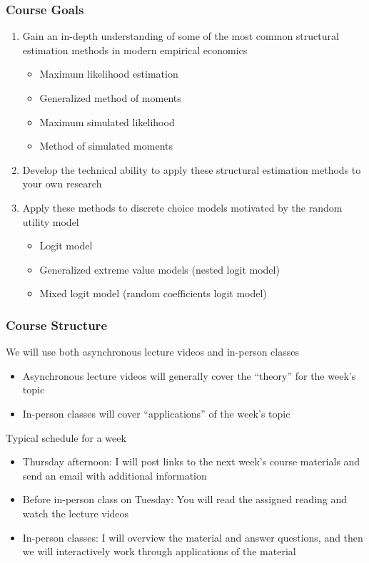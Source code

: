 \documentclass{beamer}
\begin{document}
\begin{frame}\frametitle{Course Goals}
    \begin{enumerate}
        \item Gain an in-depth understanding of some of the most common structural estimation methods in modern empirical economics
        \begin{itemize}
            \item Maximum likelihood estimation
            \item Generalized method of moments
            \item Maximum simulated likelihood
            \item Method of simulated moments
        \end{itemize}
        \vspace{2ex} 
        \item Develop the technical ability to apply these structural estimation methods to your own research
        \vspace{2ex}
        \item Apply these methods to discrete choice models motivated by the random utility model
        \begin{itemize}
            \item Logit model
            \item Generalized extreme value models (nested logit model)
            \item Mixed logit model (random coefficients logit model)
        \end{itemize}
    \end{enumerate}
\end{frame}

\begin{frame}\frametitle{Course Structure}
    We will use both asynchronous lecture videos and in-person classes
    \begin{itemize}
        \item Asynchronous lecture videos will generally cover the ``theory'' for the week's topic
        \item In-person classes will cover ``applications'' of the week's topic
    \end{itemize}
    \vspace{2ex}
    Typical schedule for a week
    \begin{itemize}
        \item Thursday afternoon: I will post links to the next week's course materials and send an email with additional information
        \item Before in-person class on Tuesday: You will read the assigned reading and watch the lecture videos
        \item In-person classes: I will overview the material and answer questions, and then we will interactively work through applications of the material
    \end{itemize}


\end{frame}
\end{document}
